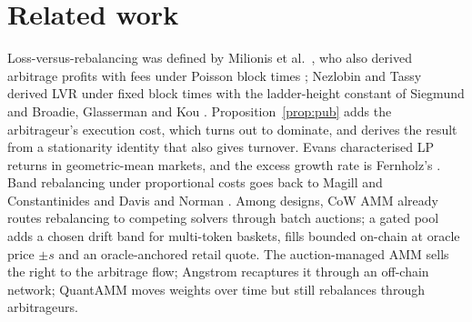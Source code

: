 \section{Related work}
\label{sec:related}
Loss-versus-rebalancing was defined by Milionis et al.\ \cite{lvr}, who also derived arbitrage profits with fees under Poisson block times \cite{lvrfees}; Nezlobin and Tassy \cite{nt} derived LVR under fixed block times with the ladder-height constant of Siegmund \cite{siegmund} and Broadie, Glasserman and Kou \cite{bgk}. Proposition~\ref{prop:pub} adds the arbitrageur's execution cost, which turns out to dominate, and derives the result from a stationarity identity that also gives turnover. Evans \cite{evans} characterised LP returns in geometric-mean markets, and the excess growth rate is Fernholz's \cite{fernholz}. Band rebalancing under proportional costs goes back to Magill and Constantinides \cite{magill} and Davis and Norman \cite{davisnorman}. Among designs, CoW AMM \cite{cowamm} already routes rebalancing to competing solvers through batch auctions; a gated pool adds a chosen drift band for multi-token baskets, fills bounded on-chain at oracle price $\pm s$ and an oracle-anchored retail quote. The auction-managed AMM \cite{amamm} sells the right to the arbitrage flow; Angstrom \cite{angstrom} recaptures it through an off-chain network; QuantAMM \cite{quantamm} moves weights over time but still rebalances through arbitrageurs.

